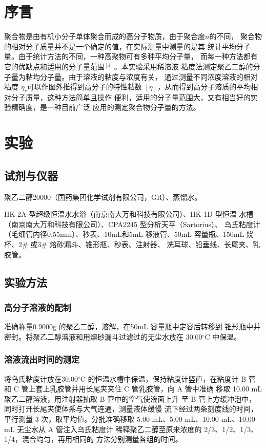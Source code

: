 \documentclass[12pt]{ctexart}
\numberwithin{equation}{section}
\begin{document}
\section{序言}

聚合物是由有机小分子单体聚合而成的高分子物质，由于聚合度$n$的不同，
聚合物的相对分子质量并不是一个确定的值，在实际测量中测量的是其
统计平均分子量。由于统计方法的不同，一种高聚物可有多种平均分子量，
而每一种方法都有它的优缺点和适用的分子量范围$^{[1]}$。本实验采用稀溶液
粘度法测定聚乙二醇的分子量为粘均分子量。由于溶液的粘度与浓度有关，
通过测量不同浓度溶液的相对粘度 $η_r$可以作图外推得到高分子的特性粘数
$[η]$，从而得到高分子溶质的平均相对分子质量，这种方法简单且操作
便利，适用的分子量范围大，又有相当好的实验精确度，是一种目前广泛
应用的测定聚合物分子量的方法。

\section{实验}
\subsection{试剂与仪器}

聚乙二醇20000（国药集团化学试剂有限公司，GR）、蒸馏水。

HK-2A 型超级恒温水水浴（南京南大万和科技有限公司）、HK-1D 型恒温
水槽（南京南大万和科技有限公司）、CPA2245 型分析天平（Sartorius）、
乌氏粘度计（毛细管内径0.55mm）、秒表、10mL和5mL 移液管、50mL
容量瓶、150mL 烧杯、2\# 或3\# 熔砂漏斗、锥形瓶、秒表、注射器、
洗耳球、铅垂线、长尾夹、乳胶管。

\subsection{实验方法}
\subsubsection{高分子溶液的配制}

准确称量0.9000g 的聚乙二醇，溶解，在50mL 容量瓶中定容后转移到
锥形瓶中并密封。将聚乙二醇溶液和用熔砂漏斗过滤过的无尘水放在
30.00$^\circ$C 中保温。

\subsubsection{溶液流出时间的测定}

将乌氏粘度计放在30.00$^\circ$C 的恒温水槽中保温，保持粘度计竖直，在粘度计
B 管和 C 管上套上乳胶管并用长尾夹夹住 C 管乳胶管，向 A 管中准确
移取 10.00 mL 聚乙二醇溶液，用注射器抽取 B 管中的空气使液面上升
至 B 管上方缓冲泡中，同时打开长尾夹使体系与大气连通，测量液体缓慢
流下经过两条刻度线的时间，平行测量 3 次，取平均值。分批准确移取
5.00 mL、5.00 mL、10.00 mL、10.00 mL 无尘水从 A 管注入乌氏粘度计
稀释聚乙二醇至原来浓度的 2/3、1/2、1/3、1/4，混合均匀，再用相同的
方法分别测量各组的时间。
\end{document}
